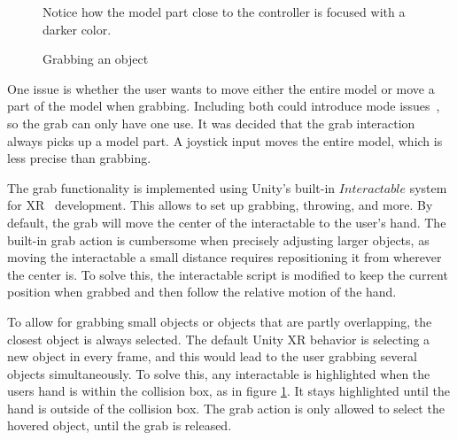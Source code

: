\documentclass[a4paper]{report}
\begin{document}
\begin{figure}[h!]
    \centering
	\hfill
  \caption{Grabbing an object}\label{grabbing}
  \small
  Notice how the model part close to the controller is focused with a darker color.
\end{figure}

One issue is whether the user wants to move either the entire model or move a part of the model when grabbing. Including both could introduce mode issues~\cite{experience_modes_nodate}, so the grab can only have one use.
It was decided that the grab interaction always picks up a model part. A joystick input moves the entire model, which is less precise than grabbing.

The grab functionality is implemented using Unity's built-in $Interactable$ system for XR~\cite{noauthor_xr_nodate} development. This allows to set up grabbing, throwing, and more. 
By default, the grab will move the center of the interactable to the user's hand. The built-in grab action is cumbersome when precisely adjusting larger objects, as moving the interactable a small distance requires repositioning it from wherever the center is. 
To solve this, the interactable script is modified to keep the current position when grabbed and then follow the relative motion of the hand.

To allow for grabbing small objects or objects that are partly overlapping, the closest object is always selected.
The default Unity XR behavior is selecting a new object in every frame, and this would lead to the user grabbing several objects simultaneously. To solve this, any interactable is highlighted when the users hand is within the collision box, as in figure \ref{grabbing}. It stays highlighted until the hand is outside of the collision box. The grab action is only allowed to select the hovered object, until the grab is released.
\end{document}
